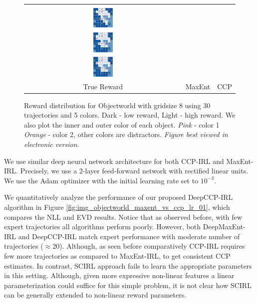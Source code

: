 \documentclass{article}
\def\MSHangBox#1{%
\begin{minipage}[t]{\textwidth}%
\begin{tabbing} %
~\\[-\baselineskip] %
#1 %
\end{tabbing}%
\end{minipage}} %
\begin{document}
\begin{figure}[t]
\centering
  \begin{tabular}{ccc}
    \MSHangBox{\includegraphics[width=0.13\textwidth]{images/objectworld/grid_8_object_20_color_5/reward_map/true_reward_trim.pdf}}&
    \MSHangBox{\includegraphics[width=0.13\textwidth]{images/objectworld/grid_8_object_20_color_5/reward_map/maxent_reward_trim.pdf}}&
    \MSHangBox{\includegraphics[width=0.13\textwidth]{images/objectworld/grid_8_object_20_color_5/reward_map/ccp_reward_trim.pdf}} \\
    True Reward & MaxEnt & CCP \\
    \end{tabular}
    \caption{ Reward distribution for Objectworld with gridsize 8 using 30 trajectories and 5 colors. Dark - low reward, Light - high reward. We also plot the inner and outer color of each object. \textit{Pink} - color 1 \textit{Orange} - color 2, other colors are distractors. \textit{Figure best viewed in electronic version.} }
    \label{fig:img_reward_map_objectworld}
\end{figure}

We use similar deep neural network architecture for both CCP-IRL and MaxEnt-IRL. Precisely, we use a 2-layer feed-forward network with rectified linear units. We use the Adam \cite{kingma2014adam} optimizer with the initial learning rate set to $10^{-3}$.

We quantitatively analyze the performance of our proposed DeepCCP-IRL algorithm in Figure \ref{fig:img_objectworld_maxent_vs_ccp_lr_01}, which compares the NLL and EVD results. Notice that as observed before, with few expert trajectories all algorithms perform poorly. However, both DeepMaxEnt-IRL and DeepCCP-IRL match expert performance with moderate number of trajectories ($\approx 20$). Although, as seen before comparatively CCP-IRL requires few more trajectories as compared to MaxEnt-IRL, to get consistent CCP estimates. In contrast, SCIRL approach fails to learn the appropriate parameters in this setting. Although, given more expressive non-linear features a linear parameterization could suffice for this simple problem, it is not clear how SCIRL can be generally extended to non-linear reward parameters. 
\end{document}
